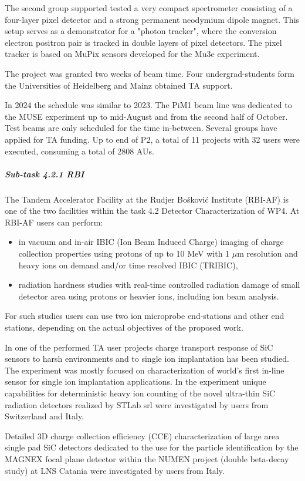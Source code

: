 The second group supported tested a very compact spectrometer consisting of a four-layer pixel detector and a strong permanent neodymium dipole magnet.  This setup serves as a demonstrator for a "photon tracker", where the conversion electron positron pair is tracked in double layers of pixel detectors. The pixel tracker is based on MuPix sensors developed for the Mu3e experiment.

The project was granted two weeks of beam time. Four undergrad-students form the Universities of Heidelberg and Mainz obtained TA support.

In 2024 the schedule was similar to 2023. The PiM1 beam line was dedicated to the MUSE experiment up to mid-August and from the second half of October. Test beams are only scheduled for the time in-between. Several groups have applied for TA funding. Up to end of P2, a total of 11 projects with 32 users were executed, consuming a total of 2808 AUs.

\subparagraph{Sub-task 4.2.1 RBI} \mbox{}

The Tandem Accelerator Facility at the Rudjer Bošković Institute (RBI-AF) is one of the two facilities within the task 4.2 Detector Characterization of WP4. At RBI-AF users can perform:
\begin{itemize}
    \item	in vacuum and in-air IBIC (Ion Beam Induced Charge) imaging of charge collection properties using protons of up to 10 MeV with 1 $\mu$m resolution and heavy ions on demand and/or time resolved IBIC (TRIBIC),
    \item	radiation hardness studies with real-time controlled radiation damage of small detector area using protons or heavier ions, including ion beam analysis.
\end{itemize}
For such studies users can use two ion microprobe end-stations and other end stations, depending on the actual objectives of the proposed work.

In one of the performed TA user projects charge transport response of SiC sensors to harsh environments and to single ion implantation has been studied. The experiment was mostly focused on characterization of world’s first in-line sensor for single ion implantation applications. In the experiment unique capabilities for deterministic heavy ion counting of the novel ultra-thin SiC radiation detectors realized by STLab srl were investigated by users from Switzerland and Italy.

Detailed 3D charge collection efficiency (CCE) characterization of large area single pad SiC detectors dedicated to the use for the particle identification by the MAGNEX focal plane detector within the NUMEN project (double beta-decay study) at LNS Catania were investigated by users from Italy.

